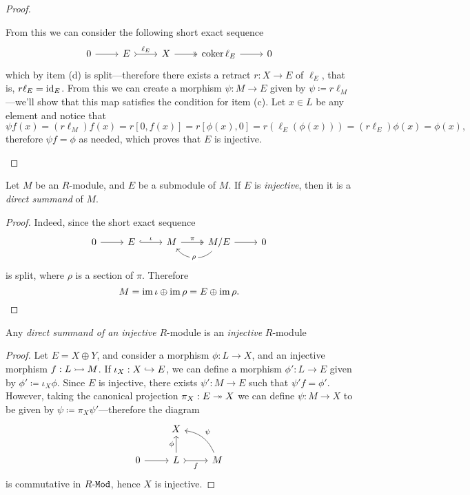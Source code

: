 \begin{proof}
\begin{itemize}
  From this we can consider the following short exact sequence
  \[
  \begin{tikzcd}
  0 \ar[r] &E \ar[r, tail, "\ell_E"]
  &X \ar[r, two heads]
  &\coker \ell_E \ar[r] &0
  \end{tikzcd}
  \]
  which by item (d) is split---therefore there exists a retract \(r: X \to E\)
  of \(\ell_E\), that is, \(r \ell_E = \operatorname{id}_E\). From this we can create a
  morphism \(\psi: M \to E\) given by \(\psi \coloneq r \ell_M\)---we'll show
  that this map satisfies the condition for item (c). Let \(x \in L\) be any
  element and notice that
  \[
  \psi f(x)
  = (r \ell_M) f(x)
  = r[0, f(x)]
  = r[\phi(x), 0]
  = r(\ell_E(\phi(x)))
  = (r \ell_E)\phi(x)
  = \phi(x),
  \]
  therefore \(\psi f = \phi\) as needed, which proves that \(E\) is injective.
\end{itemize}
\end{proof}

\begin{corollary}
\label{cor:injective-submodule-is-direct-summand}
Let \(M\) be an \(R\)-module, and \(E\) be a submodule of \(M\). If \(E\) is
\emph{injective}, then it is a \emph{direct summand} of \(M\).
\end{corollary}

\begin{proof}
Indeed, since the short exact sequence
\[
\begin{tikzcd}
0 \ar[r] &E \ar[r, hook, "\iota"] &M \ar[r, two heads, "\pi"]
&M/E \ar[l, bend left=50, "\rho" description] \ar[r] &0
\end{tikzcd}
\]
is split, where \(\rho\) is a section of \(\pi\). Therefore
\[
M = \operatorname{im} \iota \oplus \operatorname{im} \rho = E \oplus \operatorname{im} \rho.
\]
\end{proof}

\begin{proposition}
\label{prop:direct-summand-of-injective-is-injective}
Any \emph{direct summand of an injective} \(R\)-module is an \emph{injective}
\(R\)-module
\end{proposition}

\begin{proof}
Let \(E = X \oplus Y\), and consider a morphism \(\phi: L \to X\), and an
injective morphism \(f: L \rightarrowtail M\). If \(\iota_X: X \hookrightarrow E\), we can define a
morphism \(\phi': L \to E\) given by \(\phi' \coloneq \iota_X \phi\). Since
\(E\) is injective, there exists \(\psi': M \to E\) such that
\(\psi' f = \phi'\). However, taking the canonical projection
\(\pi_X: E \twoheadrightarrow X\) we can define \(\psi: M \to X\) to be given by
\(\psi \coloneq \pi_X \psi'\)---therefore the diagram
\[
\begin{tikzcd}
&X &
\\
0 \ar[r] &L \ar[u, "\phi"] \ar[r, tail, "f"'] &M \ar[lu, bend right, "\psi"']
\end{tikzcd}
\]
is commutative in \({R\text{-}\texttt{Mod}}\), hence \(X\) is injective.
\end{proof}

